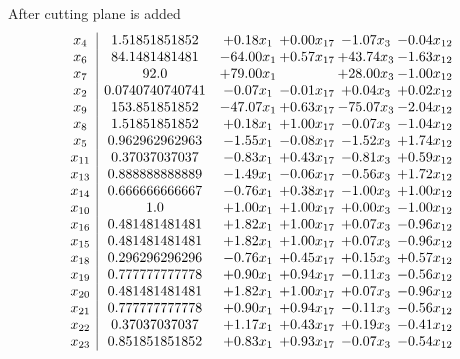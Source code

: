 \documentclass[8pt]{article}
\begin{document}
 After cutting plane is added 
\[\begin{array}{c| c c@{\hskip 2pt} c@{\hskip 2pt} c@{\hskip 2pt} c@{\hskip 2pt} }
 x_{4}   &  1.51851851852 & +  0.18 x_{1} & +  0.00 x_{17} & -1.07 x_{3} & -0.04 x_{12}\\
 x_{6}   &  84.1481481481 & -64.00 x_{1} & +  0.57 x_{17} & + 43.74 x_{3} & -1.63 x_{12}\\
 x_{7}   &  92.0 & + 79.00 x_{1} &   & + 28.00 x_{3} & -1.00 x_{12}\\
 x_{2}   &  0.0740740740741 & -0.07 x_{1} & -0.01 x_{17} & +  0.04 x_{3} & +  0.02 x_{12}\\
 x_{9}   &  153.851851852 & -47.07 x_{1} & +  0.63 x_{17} & -75.07 x_{3} & -2.04 x_{12}\\
 x_{8}   &  1.51851851852 & +  0.18 x_{1} & +  1.00 x_{17} & -0.07 x_{3} & -1.04 x_{12}\\
 x_{5}   &  0.962962962963 & -1.55 x_{1} & -0.08 x_{17} & -1.52 x_{3} & +  1.74 x_{12}\\
 x_{11}   &  0.37037037037 & -0.83 x_{1} & +  0.43 x_{17} & -0.81 x_{3} & +  0.59 x_{12}\\
 x_{13}   &  0.888888888889 & -1.49 x_{1} & -0.06 x_{17} & -0.56 x_{3} & +  1.72 x_{12}\\
 x_{14}   &  0.666666666667 & -0.76 x_{1} & +  0.38 x_{17} & -1.00 x_{3} & +  1.00 x_{12}\\
 x_{10}   &  1.0 & +  1.00 x_{1} & +  1.00 x_{17} & +  0.00 x_{3} & -1.00 x_{12}\\
 x_{16}   &  0.481481481481 & +  1.82 x_{1} & +  1.00 x_{17} & +  0.07 x_{3} & -0.96 x_{12}\\
 x_{15}   &  0.481481481481 & +  1.82 x_{1} & +  1.00 x_{17} & +  0.07 x_{3} & -0.96 x_{12}\\
 x_{18}   &  0.296296296296 & -0.76 x_{1} & +  0.45 x_{17} & +  0.15 x_{3} & +  0.57 x_{12}\\
 x_{19}   &  0.777777777778 & +  0.90 x_{1} & +  0.94 x_{17} & -0.11 x_{3} & -0.56 x_{12}\\
 x_{20}   &  0.481481481481 & +  1.82 x_{1} & +  1.00 x_{17} & +  0.07 x_{3} & -0.96 x_{12}\\
 x_{21}   &  0.777777777778 & +  0.90 x_{1} & +  0.94 x_{17} & -0.11 x_{3} & -0.56 x_{12}\\
 x_{22}   &  0.37037037037 & +  1.17 x_{1} & +  0.43 x_{17} & +  0.19 x_{3} & -0.41 x_{12}\\
 x_{23}   &  0.851851851852 & +  0.83 x_{1} & +  0.93 x_{17} & -0.07 x_{3} & -0.54 x_{12}\\

\end{array}\]
\end{document}

